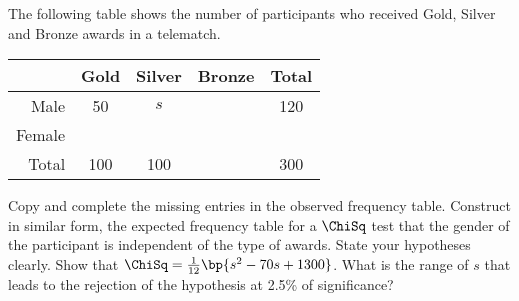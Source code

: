 \begin{problem}
    The following table shows the number of participants who received Gold, Silver and Bronze awards in a telematch.

    \begin{table}[H]
        \centering
        \begin{tabular}{|r|c|c|c|c|}
        \hline
        \multicolumn{1}{|l|}{} & Gold & Silver & Bronze & Total \\ \hline
        Male & 50 & $s$ &  & 120 \\ \hline
        Female &  &  &  &  \\ \hline
        Total & 100 & 100 &  & 300 \\ \hline
        \end{tabular}
    \end{table}
    
    Copy and complete the missing entries in the observed frequency table. Construct in similar form, the expected frequency table for a $\ChiSq$ test that the gender of the participant is independent of the type of awards. State your hypotheses clearly. Show that $\ChiSq = \frac1{12} \bp{s^2 - 70s + 1300}$. What is the range of $s$ that leads to the rejection of the hypothesis at 2.5\% of significance?
\end{problem}
